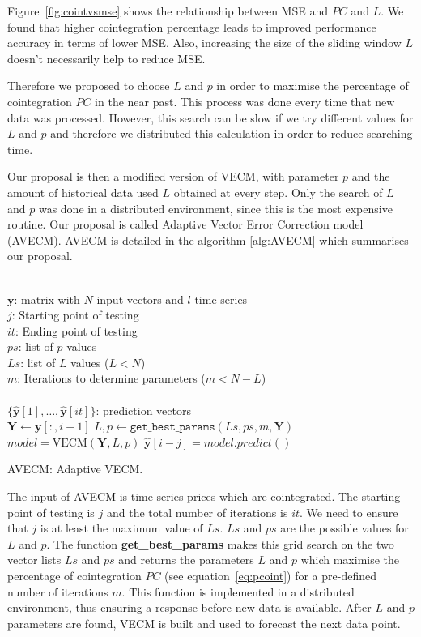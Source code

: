 Figure~\ref{fig:cointvsmse} shows the relationship between MSE and $PC$ and $L$. We
found that higher cointegration percentage leads to improved performance accuracy
in terms of lower MSE. Also, increasing the size of the sliding window $L$
doesn't necessarily help to reduce MSE.

Therefore we proposed to choose $L$ and $p$ in order to maximise the percentage
of cointegration $PC$ in the near past. This process was done every time that
new data was processed. However, this search can be slow if we try different
values for $L$ and $p$ and therefore we distributed this calculation in order to
reduce searching time.

Our proposal is then a modified version of VECM, with parameter $p$ and the
amount of historical data used $L$ obtained at every step. Only the search of
$L$ and $p$ was done in a distributed environment, since this is the most
expensive routine. Our proposal is called Adaptive Vector Error Correction model
(AVECM). AVECM is detailed in the algorithm \ref{alg:AVECM} which summarises
our proposal.

\begin{algorithm}[ht!]
\begin{algorithmic}[1]
\REQUIRE $\,$ \\
$\mathbf{y}$: matrix with $N$ input vectors and $l$ time series\\
$j$: Starting point of testing \\
$it$: Ending point of testing \\
$ps$: list of $p$ values \\
$Ls$: list of $L$ values ($L<N$) \\
$m$: Iterations to determine parameters ($m < N-L$)\\
\ENSURE  $\,$ \\
$\{ \hat{\mathbf{y}}[1],\dots,\hat{\mathbf{y}}[it]\}$: prediction vectors \\
   \STATE $\mathbf{Y} \gets \mathbf{y}[:,i-1]$
    \STATE $L,p \gets
    \texttt{get\_best\_params}(Ls,ps,m,\mathbf{Y})$
        \STATE $model = \text{VECM}(\mathbf{Y},L, p)$
        \STATE $\hat{\mathbf{y}}[i-j] = model.predict()$
\ENDFOR
\end{algorithmic}
\caption{AVECM: Adaptive VECM.}
\label{alg:AVECM}
\end{algorithm}

The input of AVECM is time series prices which are cointegrated. The starting
point of testing is $j$ and the total number of iterations is $it$. We need to
ensure that $j$ is at least the maximum value of $Ls$. $Ls$ and $ps$ are the
possible values for $L$ and $p$.  The function {\bf get\_best\_params} makes
this grid search on the two vector lists $Ls$ and $ps$ and returns the
parameters $L$ and $p$ which maximise the percentage of cointegration $PC$ (see
equation~\ref{eq:pcoint}) for a pre-defined number of iterations $m$. This
function is implemented in a distributed environment, thus ensuring a response
before new data is available.  After $L$ and $p$ parameters are found, VECM is
built and used to forecast the next data point.


